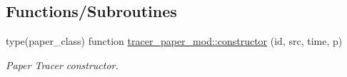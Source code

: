 \subsection*{Functions/\+Subroutines}
\begin{DoxyCompactItemize}
\item 
type(paper\+\_\+class) function \mbox{\hyperlink{namespacetracer__paper__mod_ab53f84300a313c395a5c3535f17022bb}{tracer\+\_\+paper\+\_\+mod\+::constructor}} (id, src, time, p)
\begin{DoxyCompactList}\small\item\em Paper Tracer constructor. \end{DoxyCompactList}\end{DoxyCompactItemize}
